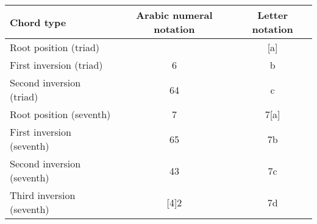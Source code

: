 \begin{tabular}{l|c|c}
Chord type & Arabic numeral notation & Letter notation
\\ \hline
Root position (triad) &  & [a] \\
First inversion (triad) & 6 & b \\
Second inversion (triad) & 64 & c \\
Root position (seventh) & 7 & 7[a] \\
First inversion (seventh) & 65 & 7b \\
Second inversion (seventh) & 43 & 7c \\
Third inversion (seventh) & [4]2 & 7d
\end{tabular}
